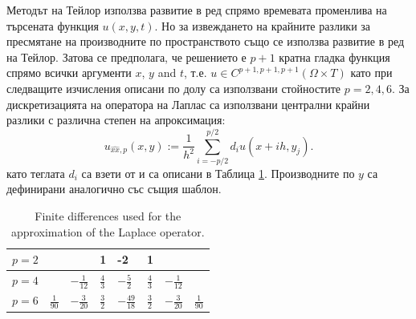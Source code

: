 \documentclass{article}
\begin{document}
Методът на Тейлор използва развитие в ред спрямо времевата променлива на търсената функция $u(x,y,t)$. Но за извеждането на крайните разлики за пресмятане на производните по пространството също се използва развитие в ред на Тейлор. Затова се предполага, че решението е $p+1$ кратна гладка функция спрямо всички аргументи $x$, $y$ and $t$, т.е. $u \in C^{p+1,p+1,p+1}(\Omega \times T)$ като при следващите изчисления описани по долу са използвани стойностите $p=2,4,6$.
За дискретизацията на оператора на Лаплас са използвани централни крайни разлики с различна степен на апроксимация:
\begin{equation}\label{fd}
u_{\widehat{xx},p}(x,y) :=  \frac{1}{h^2} \sum\limits_{i=-p/2}^{p/2} d_i u(x+ih, y_j).
\end{equation}
като теглата $d_i$ са взети от \cite{forn} и са описани в Таблица \ref{table:A00}. Производните по $y$ са дефинирани аналогично със същия шаблон.
\begin{table}[ht]
\centering
\small
		\begin{tabular}{||c|l|l|l|l|l|l|l||}
			\hline
			\hline
            $p=2$          &          &                                 &     1      &   -2   &    1    &    &        \\
   			\hline 
			\hline 
           $p=4$          &                            &   $-\frac{1}{12}$     &     $\frac{4}{3}$      &   $-\frac{5}{2} $     &    $\frac{4}{3}$    &  $-\frac{1}{12}$   &        \\
	   \hline
			\hline 
            $p=6$        &   $\frac{1}{90}$       &     $-\frac{3}{20}$     &    $\frac{3}{2}$      &    $-\frac{49}{18}$   &    $\frac{3}{2}$    & $-\frac{3}{20}$    &    $\frac{1}{90}$       \\
	   \hline
			\hline 
		\end{tabular}
	\caption{ Finite differences used for the approximation of the Laplace operator.}
	\label{table:A00}
\end{table}
\end{document}

